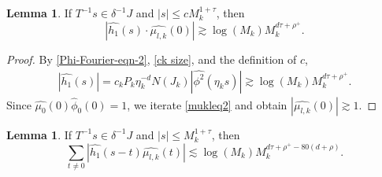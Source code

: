 \documentclass{amsart}
\numberwithin{equation}{section}
\theoremstyle{definition}
\newtheorem{lemma}[theorem]{Lemma}
\theoremstyle{definition}
\begin{document}
\begin{lemma}
If $T^{-1} s \in \delta^{-1} J$ and $|s| \leq c M_k^{1+\tau}$, then 
\begin{equation}\label{h_1_lb}
|\widehat{h_1} (s) \cdot  \widehat{\mu_{l,k}} (0) | \gtrsim \log(M_k) 
M_k^{d \tau+\rho^+}.
\end{equation}
\end{lemma}
\begin{proof}
% 
By \eqref{Phi-Fourier-eqn-2},  
%
\eqref{ck size}, and the definition of $c$, 
\begin{align*}
|\widehat{h_1}(s)| 
= c_k P_k \eta_k^{-d}N(J_k) |\widehat{\phi^2}(\eta_k s)| 
\gtrsim  
\log(M_k) 
M_k^{d\tau+\rho^+}.
\end{align*}
%
%
Since $\widehat{\mu_{0}}(0) \widehat{\phi}_0(0)=1$, we iterate \eqref{mukleq2} and obtain  $|\widehat{{\mu}_{l,k}}(0)| \gtrsim 1$. 
\end{proof}


\begin{lemma}
If $T^{-1} s \in \delta^{-1} J$ and $|s| \leq M_k^{1+\tau}$, then 
\begin{equation}\label{h_1_ub}
\sum_{t \neq 0 }|\widehat{h_1} (s-t)   \widehat{\mu_{l,k}} (t) | \lesssim \log(M_k) 
M_k^{d \tau + \rho^+ - 80(d+\rho)}.
\end{equation}
\end{lemma}
\end{document}
